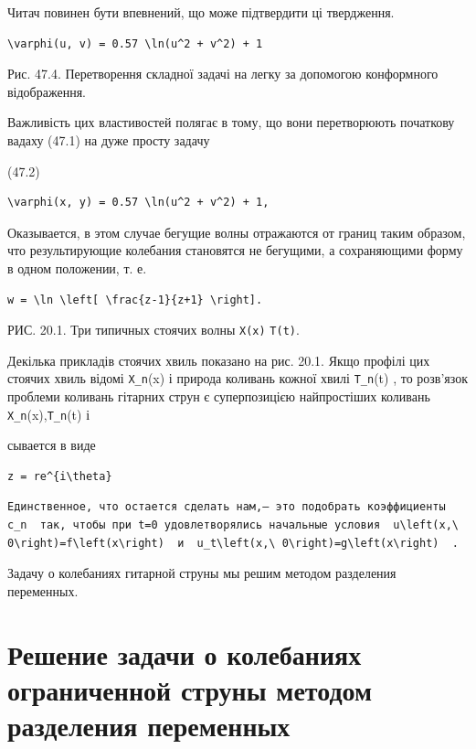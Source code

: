\documentclass[
  ukrainian,
]{article}
\begin{document}
Читач повинен бути впевнений, що може підтвердити ці твердження.

\begin{verbatim}
\varphi(u, v) = 0.57 \ln(u^2 + v^2) + 1
\end{verbatim}

Рис. 47.4. Перетворення складної задачі на легку за допомогою
конформного відображення.

Важливість цих властивостей полягає в тому, що вони перетворюють
початкову вадаху (47.1) на дуже просту задачу

(47.2)

\begin{verbatim}
\varphi(x, y) = 0.57 \ln(u^2 + v^2) + 1,
\end{verbatim}

Оказывается, в этом случае бегущие волны отражаются от границ таким
образом, что результирующие колебания становятся не бегущими, а
сохраняющими форму в одном положении, т. е.

\begin{verbatim}
w = \ln \left[ \frac{z-1}{z+1} \right].
\end{verbatim}

РИС. 20.1. Три типичных стоячих волны \texttt{X(x)} \texttt{T(t)}.

Декілька прикладів стоячих хвиль показано на рис. 20.1. Якщо профілі цих
стоячих хвиль відомі \texttt{X\_n}(x) і природа коливань кожної хвилі
\texttt{T\_n}(t) , то розв'язок проблеми коливань гітарних струн є
суперпозицією найпростіших коливань \texttt{X\_n}(x),\texttt{T\_n}(t) і

сывается в виде

\begin{verbatim}
z = re^{i\theta}
\end{verbatim}

\begin{verbatim}
Единственное, что остается сделать нам,— это подобрать коэффициенты  c_n  так, чтобы при t=0 удовлетворялись начальные условия  u\left(x,\ 0\right)=f\left(x\right)  и  u_t\left(x,\ 0\right)=g\left(x\right)  .
\end{verbatim}

Задачу о колебаниях гитарной струны мы решим методом разделения
переменных.

\section{Решение задачи о колебаниях ограниченной струны методом
разделения
переменных}\label{ux440ux435ux448ux435ux43dux438ux435-ux437ux430ux434ux430ux447ux438-ux43e-ux43aux43eux43bux435ux431ux430ux43dux438ux44fux445-ux43eux433ux440ux430ux43dux438ux447ux435ux43dux43dux43eux439-ux441ux442ux440ux443ux43dux44b-ux43cux435ux442ux43eux434ux43eux43c-ux440ux430ux437ux434ux435ux43bux435ux43dux438ux44f-ux43fux435ux440ux435ux43cux435ux43dux43dux44bux445}
\end{document}
